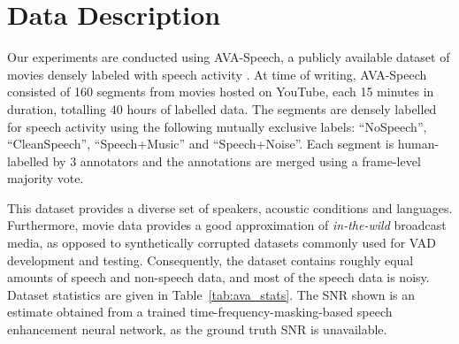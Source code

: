 \documentclass{article}
\begin{document}
\vspace{-2mm}

\section{Data Description}
\label{sec:data}

\vspace{-2mm}

Our experiments are conducted using AVA-Speech, a publicly available dataset of movies densely labeled with speech activity \cite{AVASpeech}.
At time of writing, AVA-Speech consisted of 160 segments from movies hosted on YouTube, each 15 minutes in duration, totalling 40 hours of labelled data.
The segments are densely labelled for speech activity using the following mutually exclusive labels: ``NoSpeech'', ``CleanSpeech'', ``Speech+Music'' and ``Speech+Noise''.
Each segment is human-labelled by 3 annotators and the annotations are merged using a frame-level majority vote.

This dataset provides a diverse set of speakers, acoustic conditions and languages.
Furthermore, movie data provides a good approximation of \textit{in-the-wild} broadcast media, as opposed to synthetically corrupted datasets commonly used for VAD development and testing.
Consequently, the dataset contains roughly equal amounts of speech and non-speech data, and most of the speech data is noisy.
Dataset statistics are given in \mbox{Table \ref{tab:ava_stats}}.
The SNR shown is an estimate obtained from a trained time-frequency-masking-based speech enhancement neural network, as the ground truth SNR is unavailable.
\end{document}
